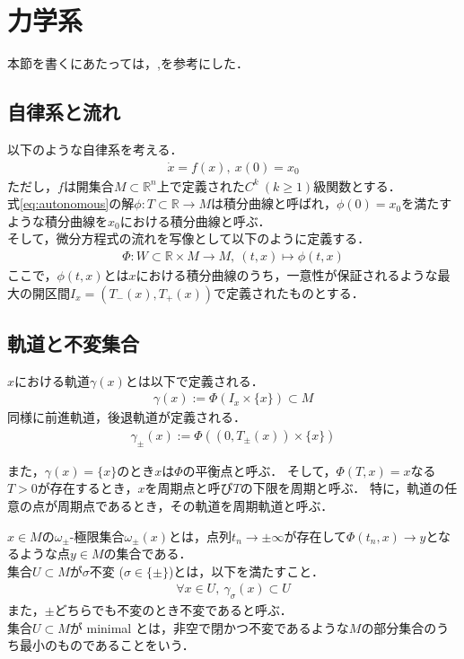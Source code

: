 \documentclass[../main]{subfiles}
\begin{document}
\section{力学系}
本節を書くにあたっては，\cite{teschlordinary},\cite{Ciesielski+2012+2110+2128}を参考にした．
\subsection{自律系と流れ}
以下のような自律系を考える．
\begin{align}
    \label{eq:autonomous}
    \dot{x}=f(x),\ x(0)=x_0
\end{align}
ただし，$f$は開集合$M\subset \mathbb{R}^n$上で定義された$C^k\ (k\geq 1)$級関数とする．\\
式\eqref{eq:autonomous}の解$\phi:T\subset \mathbb{R}\to M$は積分曲線と呼ばれ，$\phi(0)=x_0$を満たすような積分曲線を$x_0$における積分曲線と呼ぶ．\\
そして，微分方程式の流れを写像として以下のように定義する．
\begin{align*}
    \Phi:W\subset\mathbb{R}\times M\to M,\ (t,x)\mapsto \phi(t,x)
\end{align*}
ここで，$\phi(t,x)$とは$x$における積分曲線のうち，一意性が保証されるような最大の開区間$I_x=(T_-(x),T_+(x))$で定義されたものとする．
\subsection{軌道と不変集合}
$x$における軌道$\gamma(x)$とは以下で定義される．
\begin{align*}
    \gamma(x):=\Phi(I_x\times \{x\})\subset M
\end{align*}
同様に前進軌道，後退軌道が定義される．
\begin{align*}
    \gamma_\pm(x):=\Phi((0,T_\pm (x))\times \{x\})
\end{align*}

また，$\gamma(x)=\{x\}$のとき$x$は$\Phi$の平衡点と呼ぶ．
そして，$\Phi(T,x)=x$なる$T>0$が存在するとき，$x$を周期点と呼び$T$の下限を周期と呼ぶ．
特に，軌道の任意の点が周期点であるとき，その軌道を周期軌道と呼ぶ．

$x\in M$の$\omega_\pm$-極限集合$\omega_\pm(x)$とは，点列$t_n\to \pm\infty$が存在して$\Phi(t_n,x)\to y$となるような点$y\in M$の集合である．\\
集合$U\subset M$が$\sigma$不変 ($\sigma\in\{\pm\}$)とは，以下を満たすこと．
\begin{align*}
    \forall x\in U,\ \gamma_\sigma (x)\subset U
\end{align*}
また，$\pm$どちらでも不変のとき不変であると呼ぶ．\\
集合$U\subset M$が minimal とは，非空で閉かつ不変であるような$M$の部分集合のうち最小のものであることをいう．
\end{document}
